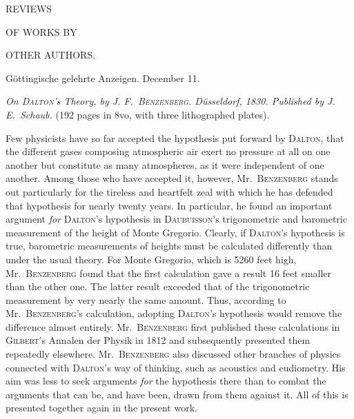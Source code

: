 \clearpage
{}
\thispagestyle{empty}
\vspace*{35mm}
\begin{center}
{\LARGE REVIEWS}\par\vspace{16mm}
{\large OF WORKS BY}\par\vspace{16mm}
{\LARGE OTHER AUTHORS.}
\end{center}
\clearpage
{}
\begin{center}\small Göttingische gelehrte Anzeigen. December 11.\end{center}

\textit{On \textup{\textsc{Dalton}}’s Theory, by \textup{J. F.\ \textsc{Benzenberg}.} Düsseldorf, \textup{1830.} Published by J. E.\ Schaub.} (192 pages in 8vo, with three lithographed plates).

Few physicists have so far accepted the hypothesis put forward by \textsc{Dalton}, that the different gases composing atmospheric air exert no pressure at all on one another but constitute as many atmospheres, as it were independent of one another. Among those who have accepted it, however, Mr.\ \textsc{Benzenberg} stands out particularly for the tireless and heartfelt zeal with which he has defended that hypothesis for nearly twenty years. In particular, he found an important argument \textit{for} \textsc{Dalton}’s hypothesis in \textsc{Daubuisson}’s trigonometric and barometric measurement of the height of Monte Gregorio. Clearly, if \textsc{Dalton}’s hypothesis is true, barometric measurements of heights must be calculated differently than under the usual theory. For Monte Gregorio, which is 5260 feet high, Mr.\ \textsc{Benzenberg} found that the first calculation gave a result 16 feet smaller than the other one. The latter result exceeded that of the trigonometric measurement by very nearly the same amount. Thus, according to Mr.\ \textsc{Benzenberg}’s calculation, adopting \textsc{Dalton}’s hypothesis would remove the difference almost entirely. Mr.\ \textsc{Benzenberg} first published these calculations in \textsc{Gilbert}’s Annalen der Physik in 1812 and subsequently
presented them repeatedly elsewhere. Mr.\ \textsc{Benzenberg} also discussed other branches of physics connected with \textsc{Dalton}’s way of thinking, such as acoustics and eudiometry. His aim was less to seek arguments \textit{for} the hypothesis there than to combat the arguments that can be, and have been, drawn from them against it. All of this is presented together again in the present work.


